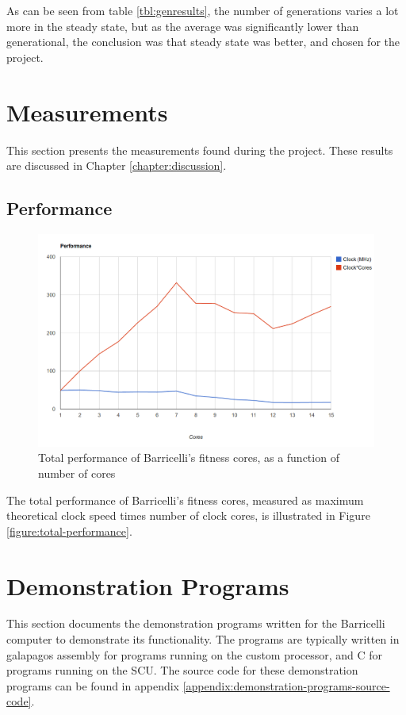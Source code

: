 As can be seen from table \ref{tbl:genresults}, the number of generations varies a lot more in the steady state, but as the average was significantly lower than generational, the conclusion was that steady state was better, and chosen for the project.


\section{Measurements}

This section presents the measurements found during the project.
These results are discussed in Chapter \vref{chapter:discussion}.

\subsection{Performance}

\begin{figure}[H]
    \includegraphics[width=\textwidth]{fpga/fig/performance.png}
    \caption{Total performance of Barricelli's fitness cores, as a function of number of cores}
    \label{figure:total-performance}
\end{figure}

The total performance of Barricelli's fitness cores, measured as maximum theoretical clock speed times number of clock cores, is illustrated in Figure \vref{figure:total-performance}.

\section{Demonstration Programs}

This section documents the demonstration programs written for the Barricelli computer to demonstrate its functionality.
The programs are typically written in \gls{galapagos} assembly for programs running on the custom processor, and C for programs running on the \Gls{SCU}.
The source code for these demonstration programs can be found in appendix \vref{appendix:demonstration-programs-source-code}.

